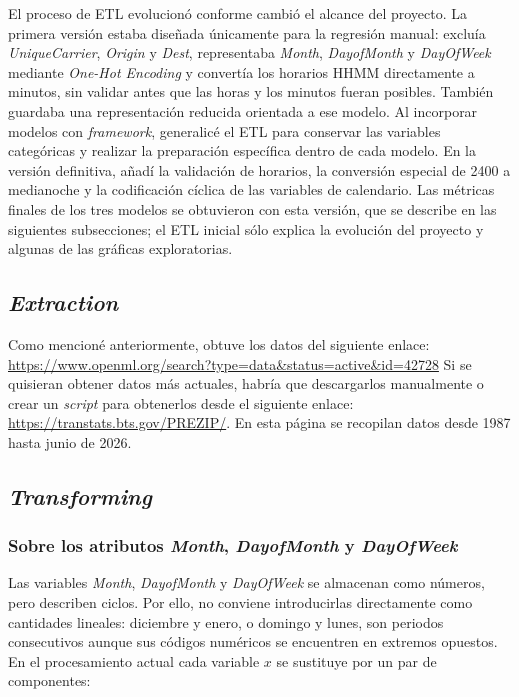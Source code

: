\documentclass[a4paper,12pt,twocolumn]{report}
\begin{document}
El proceso de ETL evolucionó conforme cambió el alcance del proyecto. La primera versión estaba diseñada únicamente para la regresión manual: excluía \textit{UniqueCarrier}, \textit{Origin} y \textit{Dest}, representaba \textit{Month}, \textit{DayofMonth} y \textit{DayOfWeek} mediante \textit{One-Hot Encoding} y convertía los horarios HHMM directamente a minutos, sin validar antes que las horas y los minutos fueran posibles. También guardaba una representación reducida orientada a ese modelo.
\newline
Al incorporar modelos con \textit{framework}, generalicé el ETL para conservar las variables categóricas y realizar la preparación específica dentro de cada modelo. En la versión definitiva, añadí la validación de horarios, la conversión especial de 2400 a medianoche y la codificación cíclica de las variables de calendario. Las métricas finales de los tres modelos se obtuvieron con esta versión, que se describe en las siguientes subsecciones; el ETL inicial sólo explica la evolución del proyecto y algunas de las gráficas exploratorias.

\subsection{\textit{Extraction}}

Como mencioné anteriormente, obtuve los datos del siguiente enlace: \url{https://www.openml.org/search?type=data&status=active&id=42728}
\newline
Si se quisieran obtener datos más actuales, habría que descargarlos manualmente o crear un \textit{script} para obtenerlos desde el siguiente enlace: \url{https://transtats.bts.gov/PREZIP/}. En esta página se recopilan datos desde 1987 hasta junio de 2026.

\subsection{\textit{Transforming}}

\subsubsection{Sobre los atributos \textit{Month}, \textit{DayofMonth} y \textit{DayOfWeek}}

Las variables \textit{Month}, \textit{DayofMonth} y \textit{DayOfWeek} se almacenan como números, pero describen ciclos. Por ello, no conviene introducirlas directamente como cantidades lineales: diciembre y enero, o domingo y lunes, son periodos consecutivos aunque sus códigos numéricos se encuentren en extremos opuestos. En el procesamiento actual cada variable $x$ se sustituye por un par de componentes:
\end{document}
